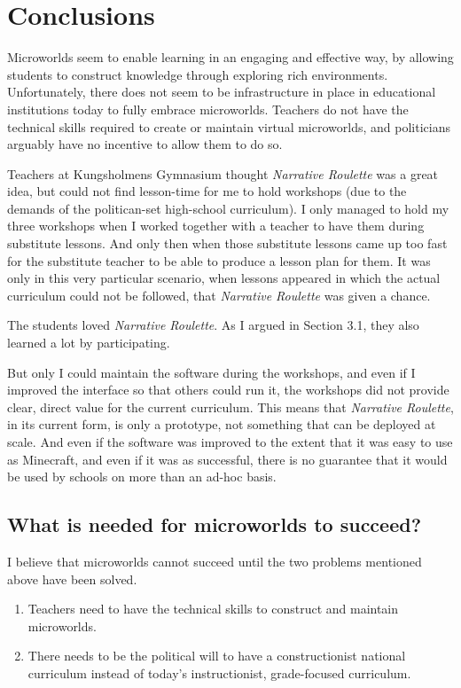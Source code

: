 \section{Conclusions}

Microworlds seem to enable learning in an engaging and effective way, by
allowing students to construct knowledge through exploring rich environments.
Unfortunately, there does not seem to be infrastructure in place in
educational institutions today to fully embrace microworlds. Teachers do
not have the technical skills required to create or maintain virtual
microworlds, and politicians arguably have no incentive to allow them to
do so.

Teachers at Kungsholmens Gymnasium thought \emph{Narrative Roulette} was
a great idea, but could not find lesson-time for me to hold workshops
(due to the demands of the politican-set high-school curriculum). I only
managed to hold my three workshops when I worked together with a teacher
to have them during substitute lessons. And only then when those
substitute lessons came up too fast for the substitute teacher to be
able to produce a lesson plan for them. It was only in this very
particular scenario, when lessons appeared in which the actual
curriculum could not be followed, that \emph{Narrative Roulette} was
given a chance.

The students loved \emph{Narrative Roulette}\cite{ingulfson}. As I argued in Section 3.1, they also
learned a lot by participating.

But only I could maintain the software during the workshops, and even if
I improved the interface so that others could run it, the workshops did
not provide clear, direct value for the current curriculum. This means
that \emph{Narrative Roulette}, in its current form, is only a
prototype, not something that can be deployed at scale. And even if the
software was improved to the extent that it was easy to use as
Minecraft, and even if it was as successful, there is no guarantee that it would
be used by schools on more than an ad-hoc basis.

\subsection{What is needed for microworlds to succeed?}

I believe that microworlds cannot succeed until the two problems
mentioned above have been solved.

\begin{enumerate}

\item
  Teachers need to have the technical skills to construct and maintain
  microworlds.

\item
  There needs to be the political will to have a constructionist
  national curriculum instead of today's instructionist, grade-focused curriculum.

\end{enumerate}

